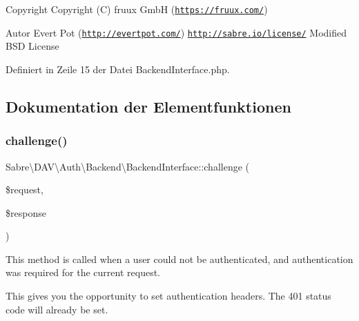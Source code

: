 \begin{DoxyCopyright}{Copyright}
Copyright (C) fruux GmbH (\href{https://fruux.com/}{\tt https\+://fruux.\+com/}) 
\end{DoxyCopyright}
\begin{DoxyAuthor}{Autor}
Evert Pot (\href{http://evertpot.com/}{\tt http\+://evertpot.\+com/})  \href{http://sabre.io/license/}{\tt http\+://sabre.\+io/license/} Modified B\+SD License 
\end{DoxyAuthor}


Definiert in Zeile 15 der Datei Backend\+Interface.\+php.



\subsection{Dokumentation der Elementfunktionen}
\mbox{\label{interface_sabre_1_1_d_a_v_1_1_auth_1_1_backend_1_1_backend_interface_a486025eeb4b3b342e7bea4e692a83d94}} 
\subsubsection{\texorpdfstring{challenge()}{challenge()}}
{\footnotesize\ttfamily Sabre\textbackslash{}\+D\+A\+V\textbackslash{}\+Auth\textbackslash{}\+Backend\textbackslash{}\+Backend\+Interface\+::challenge (\begin{DoxyParamCaption}\item[{\mbox{\hyperlink{interface_sabre_1_1_h_t_t_p_1_1_request_interface}{Request\+Interface}}}]{\$request,  }\item[{\mbox{\hyperlink{interface_sabre_1_1_h_t_t_p_1_1_response_interface}{Response\+Interface}}}]{\$response }\end{DoxyParamCaption})}

This method is called when a user could not be authenticated, and authentication was required for the current request.

This gives you the opportunity to set authentication headers. The 401 status code will already be set.

